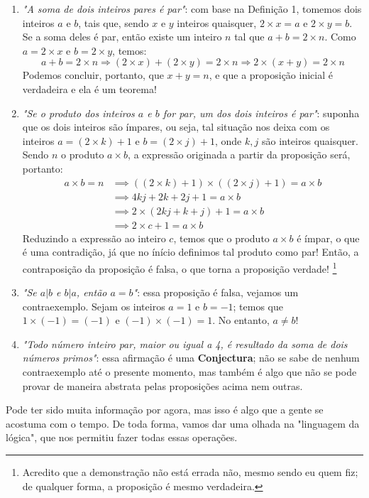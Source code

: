 \documentclass[13pt,letterpaper]{article}
\begin{document}
\begin{enumerate}
    \item \emph{"A soma de dois inteiros pares é par"}: com base na Definição 1, tomemos dois inteiros $a$ e $b$, tais que, sendo $x$ e $y$ inteiros quaisquer, $2 \times x = a$ e $2 \times y = b$. Se a soma deles é par, então existe um inteiro $n$ tal que $a + b = 2 \times n$. Como $a = 2 \times x$ e $b = 2 \times y$, temos:
    \begin{equation}
        a + b = 2 \times n
        \Longrightarrow (2 \times x) + (2 \times y) = 2 \times n
        \Longrightarrow 2 \times (x + y) = 2 \times n
    \end{equation}
    Podemos concluir, portanto, que $x + y = n$, e que a proposição inicial é verdadeira e ela é um teorema! 
    \item \emph{"Se o produto dos inteiros $a$ e $b$ for par, um dos dois inteiros é par"}: suponha que os dois inteiros são ímpares, ou seja, tal situação nos deixa com os inteiros $a = (2 \times k) + 1$ e $b = (2 \times j) + 1$, onde $k, j$ são inteiros quaisquer.
    Sendo $n$ o produto $a \times b$, a expressão originada a partir da proposição será, portanto:
        \begin{align*}
        a \times b = n &\implies 
        ((2 \times k) + 1) \times ((2 \times j) + 1) = a \times b \\ &\implies 
        4kj + 2k + 2j + 1 = a \times b \\ &\implies
        2 \times (2kj + k + j) + 1 = a \times b \\ &\implies
        2 \times c + 1 = a \times b
        \end{align*}
    Reduzindo a expressão ao inteiro $c$, temos que o produto $a \times b$ é ímpar, o que é uma contradição, já que no ínício definimos tal produto como par! Então, a contraposição da proposição é falsa, o que torna a proposição verdade!
    \footnote{Acredito que a demonstração não está errada não, mesmo sendo eu quem fiz; de qualquer forma, a proposição é mesmo verdadeira.}
    \item \emph{"Se $a|b$ e $b|a$, então $a = b$"}: essa proposição é falsa, vejamos um contraexemplo. Sejam os inteiros $a = 1$ e $b = -1$; temos que $ 1 \times (-1) = (-1)$ e $(-1) \times (-1) = 1$. No entanto, $a \ne b$!
    \item \emph{"Todo número inteiro par, maior ou igual a 4, é resultado da soma de dois números primos"}: essa afirmação é uma \textbf{Conjectura}; não se sabe de nenhum contraexemplo até o presente momento, mas também é algo que não se pode provar de maneira abstrata pelas proposições acima nem outras.
\end{enumerate}
Pode ter sido muita informação por agora, mas isso é algo que a gente se acostuma com o tempo. De toda forma, vamos dar uma olhada na "linguagem da lógica", que nos permitiu fazer todas essas operações.
\end{document}

